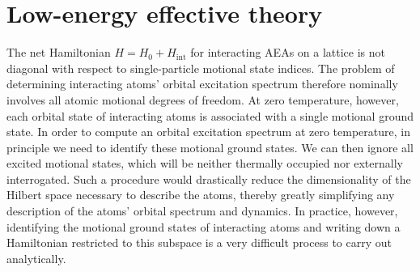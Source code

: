 \documentclass[preprint,showkeys,nofootinbib]{revtex4-1}
\renewcommand{\t}{\text} %
\newcommand{\1}{\mathds{1}}
\begin{document}
\section{Low-energy effective theory}
\label{sec:low_energy}

The net Hamiltonian $H = H_0 + H_{\t{int}}$ for interacting AEAs on a
lattice is not diagonal with respect to single-particle motional state
indices.  The problem of determining interacting atoms' orbital
excitation spectrum therefore nominally involves all atomic motional
degrees of freedom.  At zero temperature, however, each orbital state
of interacting atoms is associated with a single motional ground
state.  In order to compute an orbital excitation spectrum at zero
temperature, in principle we need to identify these motional ground
states.  We can then ignore all excited motional states, which will be
neither thermally occupied nor externally interrogated.  Such a
procedure would drastically reduce the dimensionality of the Hilbert
space necessary to describe the atoms, thereby greatly simplifying any
description of the atoms' orbital spectrum and dynamics.  In practice,
however, identifying the motional ground states of interacting atoms
and writing down a Hamiltonian restricted to this subspace is a very
difficult process to carry out analytically.
\end{document}
